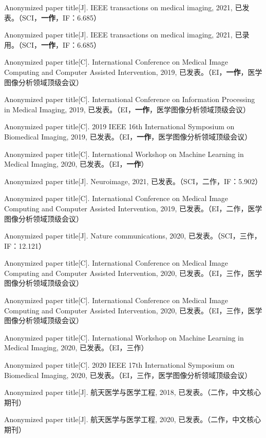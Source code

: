 \cleardoublepage
{}



%
        {
        \noindent [1] Anonymized paper title[J]. IEEE transactions on medical imaging, 2021, 已发表。（SCI，\textbf{一作}，IF：6.685）
        
        \noindent [2] Anonymized paper title[J]. IEEE transactions on medical imaging, 2021, 已录用。（SCI，\textbf{一作}，IF：6.685）
        
        \noindent [3] Anonymized paper title[C]. International Conference on Medical Image Computing and Computer Assisted Intervention, 2019, 已发表。（EI，\textbf{一作}，医学图像分析领域顶级会议）
        
        \noindent [4] Anonymized paper title[C]. International Conference on Information Processing in Medical Imaging, 2019, 已发表。（EI，\textbf{一作}，医学图像分析领域顶级会议）
        
        \noindent [5] Anonymized paper title[C]. 2019 IEEE 16th International Symposium on Biomedical Imaging, 2019, 已发表。（EI，\textbf{一作}，医学图像分析领域顶级会议）
        
        \noindent [6] Anonymized paper title[C]. International Workshop on Machine Learning in Medical Imaging, 2020, 已发表。（EI，\textbf{一作}）
        
        \noindent [7] Anonymized paper title[J]. Neuroimage, 2021, 已发表。（SCI，二作，IF：5.902） 
        
        \noindent [8] Anonymized paper title[C]. International Conference on Medical Image Computing and Computer Assisted Intervention, 2019, 已发表。（EI，二作，医学图像分析领域顶级会议）
        
        \noindent [9] Anonymized paper title[J]. Nature communications, 2020, 已发表。（SCI，三作，IF：12.121）
        
        \noindent [10] Anonymized paper title[C]. International Conference on Medical Image Computing and Computer Assisted Intervention, 2020, 已发表。（EI，三作，医学图像分析领域顶级会议）
        
        \noindent [11] Anonymized paper title[C]. International Conference on Medical Image Computing and Computer Assisted Intervention, 2020, 已发表。（EI，三作，医学图像分析领域顶级会议）
        
        \noindent [12] Anonymized paper title[C]. International Workshop on Machine Learning in Medical Imaging, 2020, 已发表。（EI，三作）
        
        \noindent [13] Anonymized paper title[C]. 2020 IEEE 17th International Symposium on Biomedical Imaging, 2020, 已发表。（EI，三作，医学图像分析领域顶级会议）
        
        \noindent [14] Anonymized paper title[J]. 航天医学与医学工程, 2018, 已发表。（二作，中文核心期刊）
        
        \noindent [15] Anonymized paper title[J]. 航天医学与医学工程, 2020, 已发表。（二作，中文核心期刊）
        }

